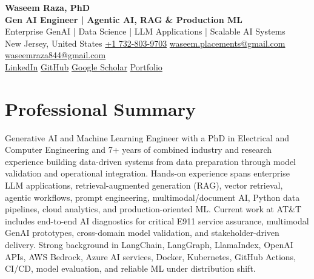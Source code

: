 \documentclass[9pt,letterpaper]{extarticle}
\begin{document}
\begin{center}
{\LARGE\bfseries Waseem Raza, PhD}\\[2pt]
{\large\bfseries Gen AI Engineer | Agentic AI, RAG \& Production ML}\\[1pt]
{\small Enterprise GenAI | Data Science | LLM Applications | Scalable AI Systems}\\[3pt]
{\footnotesize New Jersey, United States \quad
{}\enspace \href{tel:+17328039703}{+1 732-803-9703} \quad
{}\enspace \href{mailto:waseem.placements@gmail.com}{waseem.placements@gmail.com} \textbar{}
\href{mailto:waseemraza844@gmail.com}{waseemraza844@gmail.com}\\[1pt]
\href{https://www.linkedin.com/in/waseem-raza-phd-9a737858/}{LinkedIn} \textbar{}
\href{https://github.com/WaseemRaza844}{GitHub} \textbar{}
\href{https://scholar.google.com/citations?user=d58Drr0AAAAJ&hl=en}{Google Scholar} \textbar{}
\href{https://waseemraza844.github.io/portfolio/}{Portfolio}}
\end{center}
\vspace{-5pt}

\section{Professional Summary}
Generative AI and Machine Learning Engineer with a PhD in Electrical and Computer Engineering and 7+ years of combined industry and research experience building data-driven systems from data preparation through model validation and operational integration. Hands-on experience spans enterprise LLM applications, retrieval-augmented generation (RAG), vector retrieval, agentic workflows, prompt engineering, multimodal/document AI, Python data pipelines, cloud analytics, and production-oriented ML. Current work at AT\&T includes end-to-end AI diagnostics for critical E911 service assurance, multimodal GenAI prototypes, cross-domain model validation, and stakeholder-driven delivery. Strong background in LangChain, LangGraph, LlamaIndex, OpenAI APIs, AWS Bedrock, Azure AI services, Docker, Kubernetes, GitHub Actions, CI/CD, model evaluation, and reliable ML under distribution shift.
\end{document}
